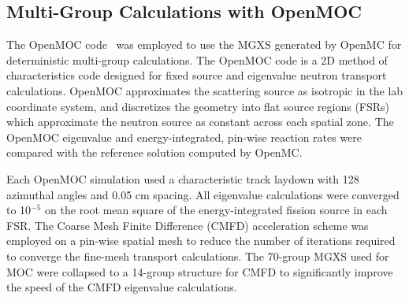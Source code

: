 \subsection{Multi-Group Calculations with OpenMOC}
\label{subsec:openmoc}

The OpenMOC code~\citep{boyd2014openmoc} was employed to use the MGXS generated by OpenMC for deterministic multi-group calculations. The OpenMOC code is a 2D method of characteristics code designed for fixed source and eigenvalue neutron transport calculations. OpenMOC approximates the scattering source as isotropic in the lab coordinate system, and discretizes the geometry into flat source regions (FSRs) which approximate the neutron source as constant across each spatial zone. The OpenMOC eigenvalue and energy-integrated, pin-wise reaction rates were compared with the reference solution computed by OpenMC.

Each OpenMOC simulation used a characteristic track laydown with 128 azimuthal angles and 0.05 cm spacing. All eigenvalue calculations were converged to 10$^{-5}$ on the root mean square of the energy-integrated fission source in each FSR. The Coarse Mesh Finite Difference (CMFD) acceleration scheme was employed on a pin-wise spatial mesh to reduce the number of iterations required to converge the fine-mesh transport calculations. The 70-group MGXS used for MOC were collapsed to a 14-group structure for CMFD to significantly improve the speed of the CMFD eigenvalue calculations.
